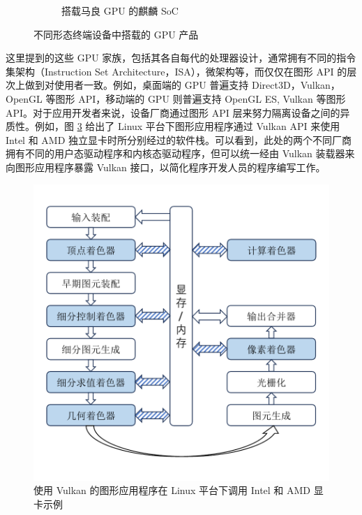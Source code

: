 \begin{figure}[htbp]
\begin{minipage}[b]{\textwidth}
\begin{subfigure}[b]{0.33\textwidth}
            \caption{搭载马良 GPU 的麒麟 SoC}
            \label{fig:sub_kirin9000s}
        \end{subfigure}
    \end{minipage}
    

    \caption{不同形态终端设备中搭载的 GPU 产品\cite{sapphire2024radeon, tpu2020intelcorei710700, bilibili2023huaweimate60pro}}
    \label{fig:gpu_gallery}
\end{figure}

这里提到的这些 GPU 家族，包括其各自每代的处理器设计，通常拥有不同的指令集架构（Instruction Set Architecture，ISA），微架构等，而仅仅在图形 API 的层次上做到对使用者一致。例如，桌面端的 GPU 普遍支持 Direct3D，Vulkan，OpenGL 等图形 API，移动端的 GPU 则普遍支持 OpenGL ES, Vulkan 等图形 API。对于应用开发者来说，设备厂商通过图形 API 层来努力隔离设备之间的异质性。例如，图 \ref{fig:drivers_overview} 给出了 Linux 平台下图形应用程序通过 Vulkan API 来使用 Intel 和 AMD 独立显卡时所分别经过的软件栈。可以看到，此处的两个不同厂商拥有不同的用户态驱动程序和内核态驱动程序，但可以统一经由 Vulkan 装载器来向图形应用程序暴露 Vulkan 接口，以简化程序开发人员的程序编写工作。

\begin{figure}
    \centering
    \includegraphics[page=2, width=0.8\linewidth]{figures/pictures.pdf}
    \caption{使用 Vulkan 的图形应用程序在 Linux 平台下调用 Intel 和 AMD 显卡示例}
    \label{fig:drivers_overview}
\end{figure}

